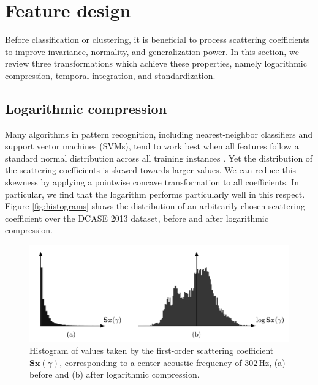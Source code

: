 \documentclass[journal]{IEEEtran}
\begin{document}
\section{Feature design}
\label{sec:design}

Before classification or clustering, it is beneficial to process scattering coefficients to improve invariance, normality, and generalization power.
In this section, we review three transformations which achieve these properties, namely logarithmic compression, temporal integration, and standardization.

\subsection{Logarithmic compression}
\label{sec:logcomp}

Many algorithms in pattern recognition, including nearest-neighbor classifiers and support vector machines (SVMs), tend to work best when all features follow a standard normal distribution across all training instances \cite{Hsu2003}.
Yet the distribution of the scattering coefficients is skewed towards larger values. We can reduce this skewness by applying a pointwise concave transformation to all coefficients. In particular, we find that the logarithm performs particularly well in this respect.
Figure \ref{fig:histograms} shows the distribution of an arbitrarily chosen scattering coefficient over the DCASE 2013 dataset, before and after logarithmic compression.

\begin{figure}
\begin{center}
\includegraphics[width=\columnwidth]{bw/compression}
\caption{
\label{fig:histograms}
Histogram of values taken by the first-order scattering coefficient $\mathbf{S}\boldsymbol{x}(\gamma)$, corresponding to a center acoustic frequency of $302\,\mathrm{Hz}$,
(a) before and (b) after logarithmic compression.}
\label{fig:compression}
\end{center}
\end{figure}
\end{document}
